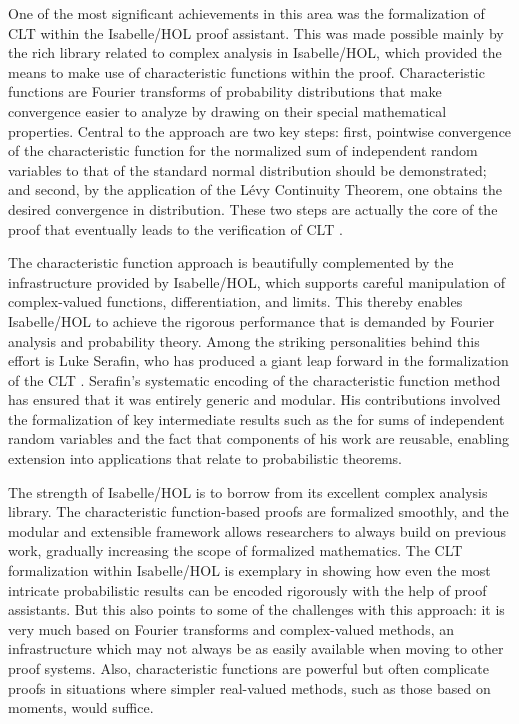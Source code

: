 One of the most significant achievements in this area was the formalization of CLT within the Isabelle/HOL proof assistant. This was made possible mainly by the rich library related to complex analysis in Isabelle/HOL, which provided the means to make use of characteristic functions within the proof. Characteristic functions are Fourier transforms of probability distributions that make convergence easier to analyze by drawing on their special mathematical properties. Central to the approach are two key steps: first, pointwise convergence of the characteristic function for the normalized sum of independent random variables to that of the standard normal distribution should be demonstrated; and second, by the application of the L\'evy Continuity Theorem, one obtains the desired convergence in distribution. These two steps are actually the core of the proof that eventually leads to the verification of CLT \cite{billingsley2017probability}.

The characteristic function approach is beautifully complemented by the infrastructure provided by Isabelle/HOL, which supports careful manipulation of complex-valued functions, differentiation, and limits. This thereby enables Isabelle/HOL to achieve the rigorous performance that is demanded by Fourier analysis and probability theory. Among the striking personalities behind this effort is Luke Serafin, who has produced a giant leap forward in the formalization of the CLT \cite{serafin2015formally}. Serafin's systematic encoding of the characteristic function method has ensured that it was entirely generic and modular. His contributions involved the formalization of key intermediate results such as the for sums of independent random variables and the fact that components of his work are reusable, enabling extension into applications that relate to probabilistic theorems.

The strength of Isabelle/HOL is to borrow from its excellent complex analysis library. The characteristic function-based proofs are formalized smoothly, and the modular and extensible framework allows researchers to always build on previous work, gradually increasing the scope of formalized mathematics. The CLT formalization within Isabelle/HOL is exemplary in showing how even the most intricate probabilistic results can be encoded rigorously with the help of proof assistants. But this also points to some of the challenges with this approach: it is very much based on Fourier transforms and complex-valued methods, an infrastructure which may not always be as easily available when moving to other proof systems. Also, characteristic functions are powerful but often complicate proofs in situations where simpler real-valued methods, such as those based on moments, would suffice.

